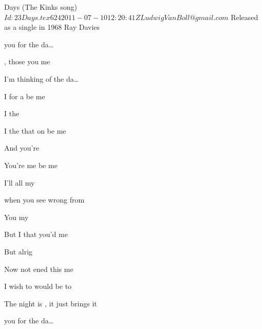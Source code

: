 \begin{SBSong}{Days (The Kinks song)}
  {$Id: 23Days.tex 624 2011-07-10 12:20:41Z LudwigVanBoll@gmail.com $}
 {Released as a single in 1968}
  {Ray Davies}
  \begin{SBVerse}
 	 you for the da\ldots{}

 	  , 
      those   you  me 

    I'm thinking of the da\ldots{}
    
    I  for  a   be me  

    I  the 

    I  the  that  on  be me   

    And  you're 

    You're  me    be me  
  \end{SBVerse}
  \begin{SBVerse}
 	 I'll  all my 

 	 when you  see wrong from 

	You  my 

	But  I  that   you'd  me 

	But  alrig

    Now  not ened	 this   me 
  \end{SBVerse}
  \begin{SBVerse}
    I wish to would be to
    
    The night is , it just brings   it  
  \end{SBVerse}
  \ifChordBk
    \begin{SBVerse}
       you for the da\ldots{}


\end{SBVerse}
\end{SBSong}
